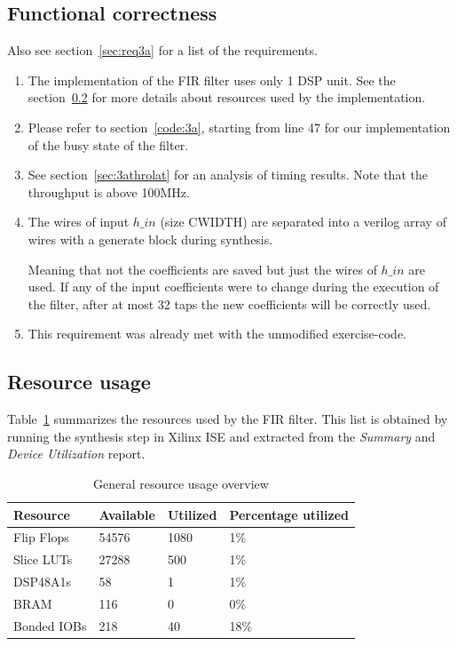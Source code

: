 \documentclass[a4paper,twoside,11pt, fleqn]{article}
\begin{document}
\subsection{Functional correctness}
Also see section~\ref{sec:req3a} for a list of the requirements.
\begin{enumerate}
	\item The implementation of the FIR filter uses only 1 DSP unit. See the				section~\ref{sec:resc3a} for more details about resources used by 		the implementation.
	\item Please refer to section~\ref{code:3a}, starting from line 47 for our implementation of the busy state of the filter.
	\item See section~\ref{sec:3athrolat} for an analysis of timing results. Note that the throughput is above 100MHz.
	\item The wires of input $h\_in$ (size CWIDTH) are separated into a verilog 			array of wires with a generate block during synthesis. 
	
	Meaning that not the coefficients are saved but just the wires of $h\_in$ are used. If any of the input coefficients were to change during the execution of the filter, after at most 32 taps the new coefficients will be correctly used.
	\item This requirement was already met with the unmodified exercise-code.
\end{enumerate}

\subsection{Resource usage}
\label{sec:resc3a}

Table~\ref{tab:3ausage} summarizes the resources used by the FIR filter. This list is obtained by running the synthesis step in Xilinx ISE and extracted from the \textit{Summary} and \textit{Device Utilization} report.

\begin{table}[h]
\begin{tabular}{|l|l|l|l|}
\hline
\textbf{Resource} & \textbf{Available} & \textbf{Utilized} & \textbf{Percentage utilized}\\
\hline
Flip Flops	& 54576 & 1080 	& 1\%\\
Slice LUTs 	& 27288 & 500 	& 1\%\\
DSP48A1s	& 58 	& 1 	& 1\%\\
BRAM		& 116 	& 0 	& 0\%\\
Bonded IOBs	& 218 	& 40 	& 18\%\\
\hline
\end{tabular}
\caption{General resource usage overview}
\label{tab:3ausage}
\end{table}
\end{document}
